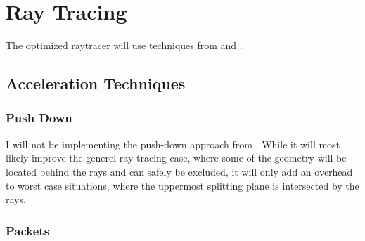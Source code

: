 \chapter{Ray Tracing}





The optimized raytracer will use techniques from 
and .



\section{Acceleration Techniques}



\subsection{Push Down}

I will not be implementing the push-down approach from
. While it will most likely improve the generel ray
tracing case, where some of the geometry will be located behind the
rays and can safely be excluded, it will only add an overhead to worst
case situations, where the uppermost splitting plane is intersected by
the rays.

\subsection{Packets}


